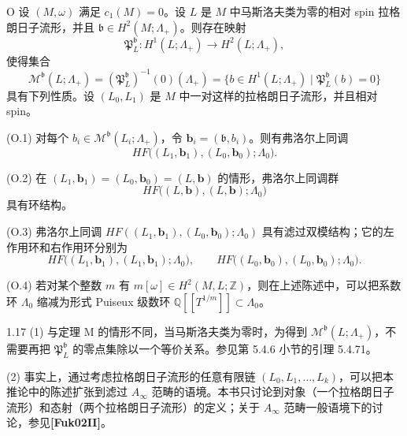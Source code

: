 \begin{corollary}{O}\label{cor:intro-O}
设 $(M,\omega)$ 满足 $c_1(M)=0$。设 $L$ 是 $M$ 中马斯洛夫类为零的相对 spin 拉格朗日子流形，并且
$\mathfrak b\in H^2(M;\Lambda_+)$。则存在映射
\[
  \mathfrak P^{\mathfrak b}_L:H^1(L;\Lambda_+)
  \longrightarrow H^2(L;\Lambda_+),
\]
使得集合
\[
  \mathcal M^{\mathfrak b}(L;\Lambda_+)
  =(\mathfrak P^{\mathfrak b}_L)^{-1}(0)(\Lambda_+)
  =\{b\in H^1(L;\Lambda_+)\mid\mathfrak P^{\mathfrak b}_L(b)=0\}
\]
具有下列性质。设 $(L_0,L_1)$ 是 $M$ 中一对这样的拉格朗日子流形，并且相对 spin。

\par\smallskip\noindent\textup{(O.1)}\quad
对每个 $b_i\in\mathcal M^{\mathfrak b}(L_i;\Lambda_+)$，令
$\mathbf b_i=(\mathfrak b,b_i)$。则有弗洛尔上同调
\[
  HF\bigl((L_1,\mathbf b_1),(L_0,\mathbf b_0);\Lambda_0\bigr).
\]

\par\smallskip\noindent\textup{(O.2)}\quad
在 $(L_1,\mathbf b_1)=(L_0,\mathbf b_0)=(L,\mathbf b)$ 的情形，弗洛尔上同调群
\[
  HF\bigl((L,\mathbf b),(L,\mathbf b);\Lambda_0\bigr)
\]
具有环结构。

\par\smallskip\noindent\textup{(O.3)}\quad
弗洛尔上同调
$HF((L_1,\mathbf b_1),(L_0,\mathbf b_0);\Lambda_0)$
具有滤过双模结构；它的左作用环和右作用环分别为
\[
  HF\bigl((L_1,\mathbf b_1),(L_1,\mathbf b_1);\Lambda_0\bigr),
  \qquad
  HF\bigl((L_0,\mathbf b_0),(L_0,\mathbf b_0);\Lambda_0\bigr).
\]

\par\smallskip\noindent\textup{(O.4)}\quad
若对某个整数 $m$ 有 $m[\omega]\in H^2(M,L;\mathbb Z)$，则在上述陈述中，可以把系数环 $\Lambda_0$ 缩减为形式 Puiseux 级数环
$\mathbb Q[[T^{1/m}]]\subset\Lambda_0$。
\end{corollary}

\begin{remark}{1.17}\label{rem:1-17}
(1) 与定理 M 的情形不同，当马斯洛夫类为零时，为得到
$\mathcal M^{\mathfrak b}(L;\Lambda_+)$，不需要再把
$\mathfrak P^{\mathfrak b}_L$ 的零点集除以一个等价关系。参见第 5.4.6 小节的引理 5.4.71。

(2) 事实上，通过考虑拉格朗日子流形的任意有限链
$(L_0,L_1,\ldots,L_k)$，可以把本推论中的陈述扩张到滤过 $A_\infty$ 范畴的语境。本书只讨论到对象（一个拉格朗日子流形）和态射（两个拉格朗日子流形）的定义；关于 $A_\infty$ 范畴一般语境下的讨论，参见\textbf{[Fuk02II]}。
\end{remark}

